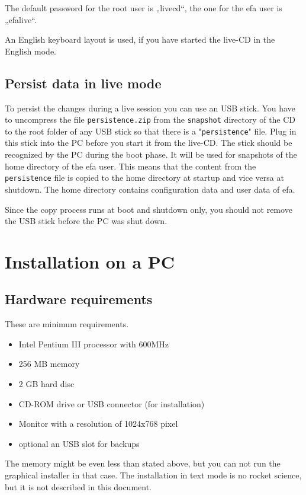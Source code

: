 \documentclass[a4paper,12pt,twoside]{article}
\begin{document}
The default password for the root user is „livecd“, the one for the efa
user is „efalive“.

An English keyboard layout is used, if you have started the live-CD in
the English mode.


\subsection{Persist data in live mode}
\label{sct:live_persist}
To persist the changes during a live session you can use an USB stick.
You have to uncompress the file \texttt{persistence.zip} from the \texttt{snapshot}
directory of the CD to the root folder of any USB stick so that there
is a "\texttt{persistence}" file. Plug in this stick
into the PC before you start it from the live-CD. The stick should be
recognized by the PC during the boot phase. It will be used for
snapshots of the home directory of the efa user. This means that the
content from the \texttt{persistence} file is copied to the home directory at
startup and vice versa at shutdown. The home directory contains
configuration data and user data of efa.

Since the copy process runs at boot and shutdown only, you should not
remove the USB stick before the PC was shut down.


\section{Installation on a PC}
\label{sct:installation_pc}
\subsection{Hardware requirements}
\label{sct:inst_hardware}
These are minimum requirements.

\begin{itemize}
    \item Intel Pentium III processor with 600MHz
    \item 256 MB memory
    \item 2 GB hard disc
    \item CD-ROM drive or USB connector (for installation)
    \item Monitor with a resolution of 1024x768 pixel
    \item optional an USB slot for backups
\end{itemize}

The memory might be even less than stated above, but you can not run the
graphical installer in that case. The installation in text mode is no
rocket science, but it is not described in this document.
\end{document}
